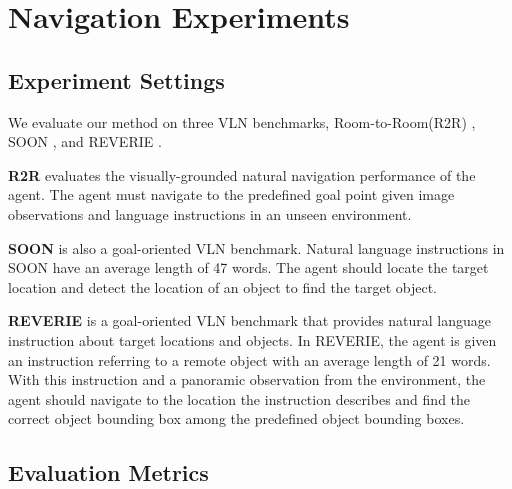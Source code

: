 \documentclass[10pt,twocolumn,letterpaper]{article}
\begin{document}
\vspace{-0.2cm}
\section{Navigation Experiments}
\label{sec:experiments}\vspace{-0.15cm}
\subsection{Experiment Settings}\vspace{-0.15cm}
We evaluate our method on three VLN benchmarks, Room-to-Room(R2R) \cite{anderson2018vision}, SOON \cite{zhu2021soon}, and REVERIE \cite{qi2020reverie}.

\noindent\textbf{R2R} evaluates the visually-grounded natural navigation performance of the agent. The agent must navigate to the predefined goal point given image observations and language instructions in an unseen environment.

\noindent\textbf{SOON} is also a goal-oriented VLN benchmark. Natural language instructions in SOON have an average length of 47 words. The agent should locate the target location and detect the location of an object to find the target object.

\noindent\textbf{REVERIE} is a goal-oriented VLN benchmark that provides natural language instruction about target locations and objects. In REVERIE, the agent is given an instruction referring to a remote object
          with an average length of 21 words. With this instruction and a panoramic observation from the environment, the agent should navigate to the location the
          instruction describes and find the correct object bounding box among the predefined object bounding boxes.
\vspace{-0.5cm}
\subsection{Evaluation Metrics}
\vspace{-0.15cm}
\end{document}
